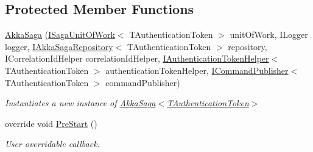 \subsection*{Protected Member Functions}
\begin{DoxyCompactItemize}
\item 
\hyperlink{classCqrs_1_1Akka_1_1Domain_1_1AkkaSaga_a2f0ebb5d1d22e3112d5b9a09fde7fb47_a2f0ebb5d1d22e3112d5b9a09fde7fb47}{Akka\+Saga} (\hyperlink{interfaceCqrs_1_1Domain_1_1ISagaUnitOfWork}{I\+Saga\+Unit\+Of\+Work}$<$ T\+Authentication\+Token $>$ unit\+Of\+Work, I\+Logger logger, \hyperlink{interfaceCqrs_1_1Akka_1_1Domain_1_1IAkkaSagaRepository}{I\+Akka\+Saga\+Repository}$<$ T\+Authentication\+Token $>$ repository, I\+Correlation\+Id\+Helper correlation\+Id\+Helper, \hyperlink{interfaceCqrs_1_1Authentication_1_1IAuthenticationTokenHelper}{I\+Authentication\+Token\+Helper}$<$ T\+Authentication\+Token $>$ authentication\+Token\+Helper, \hyperlink{interfaceCqrs_1_1Commands_1_1ICommandPublisher}{I\+Command\+Publisher}$<$ T\+Authentication\+Token $>$ command\+Publisher)
\begin{DoxyCompactList}\small\item\em Instantiates a new instance of \hyperlink{classCqrs_1_1Akka_1_1Domain_1_1AkkaSaga_a2f0ebb5d1d22e3112d5b9a09fde7fb47_a2f0ebb5d1d22e3112d5b9a09fde7fb47}{Akka\+Saga$<$\+T\+Authentication\+Token$>$} \end{DoxyCompactList}\item 
override void \hyperlink{classCqrs_1_1Akka_1_1Domain_1_1AkkaSaga_a4615beae56f595074f3ba643a890ba74_a4615beae56f595074f3ba643a890ba74}{Pre\+Start} ()
\begin{DoxyCompactList}\small\item\em User overridable callback. 


\end{DoxyCompactList}
\end{DoxyCompactItemize}

